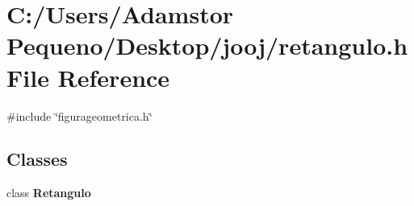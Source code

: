 \section{C\+:/\+Users/\+Adamstor Pequeno/\+Desktop/jooj/retangulo.h File Reference}
\label{retangulo_8h}
{\ttfamily \#include \char`\"{}figurageometrica.\+h\char`\"{}}\newline
\subsection*{Classes}
\begin{DoxyCompactItemize}
\item 
class \textbf{ Retangulo}
\end{DoxyCompactItemize}
